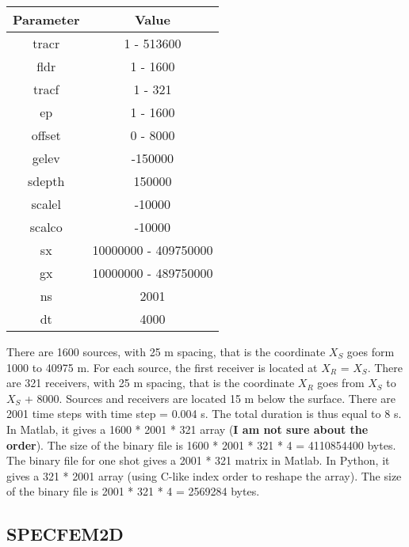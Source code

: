 \documentclass{article}
\begin{document}
\begin{center}
\begin{tabular}{|c|c|}
\hline
Parameter & Value \\
\hline
tracr & 1 - 513600 \\
fldr & 1 - 1600 \\
tracf & 1 - 321 \\
ep & 1 - 1600 \\
offset & 0 - 8000 \\
gelev & -150000 \\
sdepth & 150000 \\
scalel & -10000 \\
scalco & -10000 \\
sx & 10000000 - 409750000 \\
gx & 10000000 - 489750000 \\
ns & 2001 \\
dt & 4000 \\
\hline
\end{tabular}
\end{center}

There are 1600 sources, with 25 m spacing, that is the coordinate $X_S$ goes form 1000 to 40975 m. For each source, the first receiver is located at $X_R$ = $X_S$. There are 321 receivers, with 25 m spacing, that is the coordinate $X_R$ goes from $X_S$ to $X_S$ + 8000. Sources and receivers are located 15 m below the surface. There are 2001 time steps with time step = 0.004 s. The total duration is thus equal to 8 s.\\

In Matlab, it gives a 1600 * 2001 * 321 array (\textbf{I am not sure about the order}). The size of the binary file is 1600 * 2001 * 321 * 4 = 4110854400 bytes. The binary file for one shot gives a 2001 * 321 matrix in Matlab. In Python, it gives a 321 * 2001 array (using C-like index order to reshape the array). The size of the binary file is 2001 * 321 * 4 = 2569284 bytes.

\subsection{SPECFEM2D}

\end{document}
